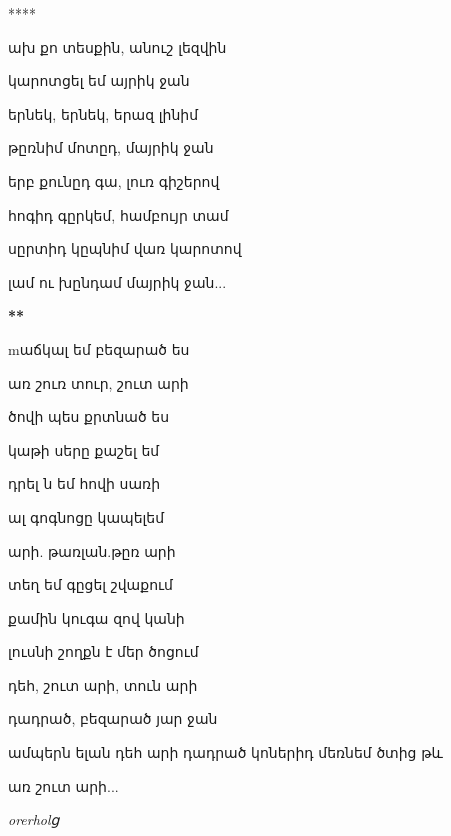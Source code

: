                         \centerline{****}


                        ախ քո տեսքին, անուշ լեզվին


                        կարոտցել եմ  այրիկ ջան
                                    

                        երնեկ, երնեկ, երազ լինիմ
                        


                        թըռնիմ մոտըդ, մայրիկ ջան
                        


                        երբ քունըդ գա, լուռ գիշերով


                        հոգիդ գըրկեմ, համբույր տամ

                          սըրտիդ կըպնիմ վառ կարոտով 


                        լամ ու խընդամ մայրիկ ջան... 

                        \centerline {\bf***}



                        mաճկալ եմ բեզարած ես


                        առ շուռ տուր, շուտ  արի





                        ծովի պես քրտնած ես

                        կաթի սերը քաշել եմ

                        դրել ն եմ հովի սառի



                        ալ գոգնոցը կապելեմ


                        արի. թառլան.թըռ արի


                        տեղ եմ գըցել շվաքում
                        
                        քամին կուգա զով կանի


                        լուսնի շողքն է մեր ծոցում


                        դեհ,  շուտ արի, տուն արի

                        դադրած, բեզարած յար ջան



                        ամպերն ելան դեհ արի դադրած կոներիդ մեռնեմ ծտից թև 


                        առ շուտ արի...


                        \it {orerholց      }



